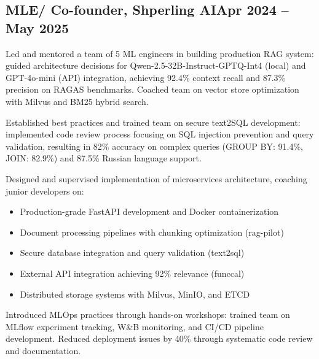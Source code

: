 \documentclass[a4paper,12pt]{article}
\begin{document}


\subsection{{MLE/ Co-founder, Shperling AI}\hfill Apr 2024 -- May 2025}
\begin{zitemize}
\item Led and mentored a team of 5 ML engineers in building production RAG system: guided architecture decisions for Qwen-2.5-32B-Instruct-GPTQ-Int4 (local) and GPT-4o-mini (API) integration, achieving 92.4\% context recall and 87.3\% precision on RAGAS benchmarks. Coached team on vector store optimization with Milvus and BM25 hybrid search.
\item Established best practices and trained team on secure text2SQL development: implemented code review process focusing on SQL injection prevention and query validation, resulting in 82\% accuracy on complex queries (GROUP BY: 91.4\%, JOIN: 82.9\%) and 87.5\% Russian language support.
\item Designed and supervised implementation of microservices architecture, coaching junior developers on:
    \begin{itemize}
        \item Production-grade FastAPI development and Docker containerization
        \item Document processing pipelines with chunking optimization (rag-pilot)
        \item Secure database integration and query validation (text2sql)
        \item External API integration achieving 92\% relevance (funccal)
        \item Distributed storage systems with Milvus, MinIO, and ETCD
    \end{itemize}
\item Introduced MLOps practices through hands-on workshops: trained team on MLflow experiment tracking, W\&B monitoring, and CI/CD pipeline development. Reduced deployment issues by 40\% through systematic code review and documentation.
\end{zitemize}
\end{document}
